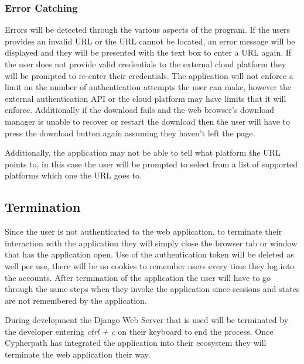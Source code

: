 \documentclass{article}
\begin{document}
            \subsubsection{Error Catching}
            Errors will be detected through the various aspects of the program. If the users provides an invalid URL or the URL cannot be located, an error message will be displayed and they will be presented with
            the text box to enter a URL again. If the user does not provide valid credentials to the external cloud platform they will be prompted to re-enter their credentials.
            The application will not enforce a limit on the number of authentication attempts the user can make, however the external authentication API or the cloud platform may have limits that it will enforce.
            Additionally if the download fails and the web browser's download manager is unable to recover or restart the download then the user will have to press the download button again assuming they haven't left
            the page.

            Additionally, the application may not be able to tell what platform the URL points to, in this case the user will be prompted to select from a list of supported platforms which one the URL goes to.

        \subsection{Termination}
        Since the user is not authenticated to the web application, to terminate their interaction with the application they will simply close the browser tab or window that has the
        application open. Use of the authentication token will be deleted as well per use, there will be no cookies to remember users every time they log into the accounts. After termination
        of the application the user will have to go through the same steps when they invoke the application since sessions and states are not remembered by the application.

        During development the Django Web Server that is used will be terminated by the developer entering \textit{ctrl + c} on their keyboard to end the process. Once Cypherpath has integrated the application into
        their ecosystem they will terminate the web application their way.

\end{document}
